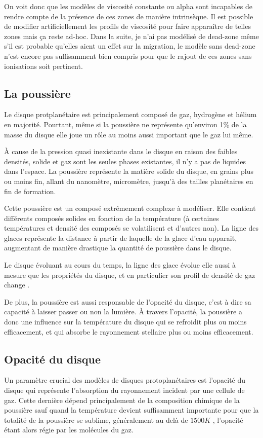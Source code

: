On voit donc que les modèles de viscosité constante ou alpha sont incapables de rendre compte de la présence de ces zones de manière intrinsèque. Il est possible de modifier artificiellement les profils de viscosité pour faire apparaître de telles zones mais ça reste ad-hoc. Dans la suite, je n'ai pas modélisé de dead-zone même s'il est probable qu'elles aient un effet sur la migration, le modèle sans dead-zone n'est encore pas suffisamment bien compris pour que le rajout de ces zones sans ionisations soit pertinent.

\subsection{La poussière}
Le disque protplanétaire est principalement composé de gaz, hydrogène et hélium en majorité. Pourtant, même si la poussière ne représente qu'environ 1\% de la masse du disque elle joue un rôle au moins aussi important que le gaz lui même.

À cause de la pression quasi inexistante dans le disque en raison des faibles densités, solide et gaz sont les seules phases existantes, il n'y a pas de liquides dans l'espace. La poussière représente la matière solide du disque, en grains plus ou moins fin, allant du nanomètre, micromètre, jusqu'à des tailles planétaires en fin de formation. 

Cette poussière est un composé extrêmement complexe à modéliser. Elle contient différents composés solides en fonction de la température (à certaines températures et densité des composés se volatilisent et d'autres non). La ligne des glaces représente la distance à partir de laquelle de la glace d'eau apparait, augmentant de manière drastique la quantité de poussière dans le disque. 

Le disque évoluant au cours du temps, la ligne des glace évolue elle aussi à mesure que les propriétés du disque, et en particulier son profil de densité de gaz change \citep{dodsonrobinson2009icelines}.

\bigskip

De plus, la poussière est aussi responsable de l'opacité du disque, c'est à dire sa capacité à laisser passer ou non la lumière. À travers l'opacité, la poussière a donc une influence sur la température du disque qui se refroidit plus ou moins efficacement, et qui absorbe le rayonnement stellaire plus ou moins efficacement. 

\subsection{Opacité du disque}\label{sec:opacity}
Un paramètre crucial des modèles de disques protoplanétaires est l'opacité du disque qui représente l'absorption du rayonnement incident par une cellule de gaz. Cette dernière dépend principalement de la composition chimique de la poussière sauf quand la température devient suffisamment importante pour que la totalité de la poussière se sublime, généralement au delà de $1500\unit{K}$ \citep{pollack1994composition}, l'opacité étant alors régie par les molécules du gaz.

